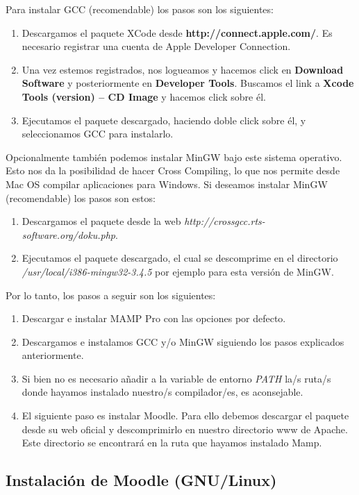 Para instalar GCC (recomendable) los pasos son los siguientes:

\begin{enumerate}
	\item Descargamos el paquete XCode desde \textbf{http://connect.apple.com/}. Es necesario registrar una cuenta de Apple Developer Connection.
	\item Una vez estemos registrados, nos logueamos y hacemos click en \textbf{Download Software} y posteriormente en \textbf{Developer Tools}. Buscamos el link a \textbf{Xcode Tools (version) – CD Image} y hacemos click sobre él.
	\item Ejecutamos el paquete descargado, haciendo doble click sobre él, y seleccionamos GCC para instalarlo.
\end{enumerate} 
	
Opcionalmente también podemos instalar MinGW bajo este sistema operativo. Esto nos da la posibilidad de hacer Cross Compiling, lo que nos permite desde Mac OS compilar aplicaciones para Windows. Si deseamos instalar MinGW (recomendable) los pasos son estos:

\begin{enumerate}
	\item Descargamos el paquete desde la web \emph{http://crossgcc.rts-software.org/doku.php}.
	\item Ejecutamos el paquete descargado, el cual se descomprime en el directorio \emph{/usr/local/i386-mingw32-3.4.5} por ejemplo para esta versión de MinGW.
\end{enumerate}

Por lo tanto, los pasos a seguir son los siguientes:

\begin{enumerate}
	\item Descargar e instalar MAMP Pro con las opciones por defecto.
	\item Descargamos e instalamos GCC y/o MinGW siguiendo los pasos explicados anteriormente.
	\item Si bien no es necesario añadir a la variable de entorno \emph{PATH} la/s ruta/s donde hayamos instalado nuestro/s compilador/es, es aconsejable.
	\item El siguiente paso es instalar Moodle. Para ello debemos descargar el paquete desde su web oficial y descomprimirlo en nuestro directorio www de Apache. Este directorio se encontrará en la ruta que hayamos instalado Mamp.
\end{enumerate}

\subsection{Instalación de Moodle (GNU/Linux)}

